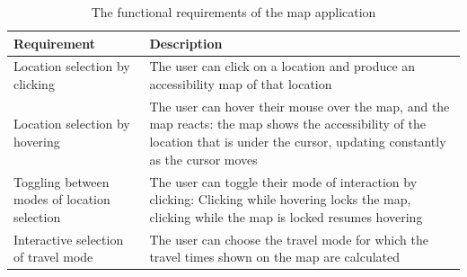 \begin{table}[H]
	\caption{The functional requirements of the map application}
	\label{tab:functional requirements}
	\centering
	\begin{tabular}{ | L{0.3\textwidth} | L{0.6\textwidth} | }
		\hline
		Requirement
		& Description
		\\
		\hline
		\hline
		Location selection by clicking
		& The user can click on a location and produce an accessibility map of that location
		\\
		\hline
		Location selection by hovering
		& The user can hover their mouse over the map, and the map reacts:
		the map shows the accessibility of the location that is under the cursor,
		updating constantly as the cursor moves
		\\
		\hline
		Toggling between modes of location selection
		& The user can toggle their mode of interaction by clicking:
		Clicking while hovering locks the map, clicking while the map is locked resumes hovering
		\\
		\hline
		Interactive selection of travel mode
		& The user can choose the travel mode for which the travel times shown on the map are calculated
		\\
		\hline
	\end{tabular}
\end{table}

